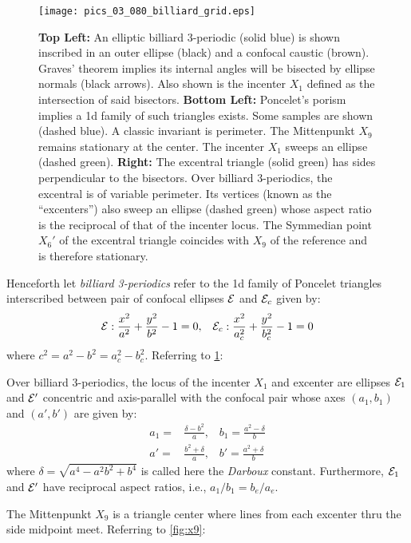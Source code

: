 \begin{figure}
    \centering
    \texttt{[image: pics\_03\_080\_billiard\_grid.eps]}
    \caption{\textbf{Top Left:} An elliptic billiard 3-periodic (solid blue) is shown inscribed in an outer ellipse (black) and a confocal caustic (brown). Graves' theorem implies its internal angles will be bisected by ellipse normals (black arrows). Also shown is the incenter $X_1$ defined as the intersection of said bisectors. \textbf{Bottom Left:} Poncelet's porism implies a 1d family of such triangles exists. Some samples are shown (dashed blue). A classic invariant is  perimeter. The Mittenpunkt $X_9$ remains stationary at the center. The incenter $X_1$ sweeps an ellipse (dashed green). \textbf{Right:} The excentral triangle (solid green) has sides perpendicular to the bisectors. Over billiard 3-periodics, the excentral is of variable perimeter. Its vertices (known as the ``excenters'') also sweep an ellipse (dashed green) whose aspect ratio is the reciprocal of that of the incenter locus. The Symmedian point $X_6'$ of the excentral triangle coincides with $X_9$ of the reference and is therefore stationary.}
    \label{fig:billiard-grid}
\end{figure}

Henceforth let {\em billiard 3-periodics} refer to the 1d family of Poncelet triangles interscribed between pair of confocal ellipses $\mathcal{E}$ and $\mathcal{E}_c$ given by:
\[ \mathcal{E}:\frac{x^2}{a^2}+\frac{y^2}{b^2}-1=0,\;\;\;\mathcal{E}_c:\frac{x^2}{a_c^2}+\frac{y^2}{b_c^2}-1=0\]
where $c^2=a^2-b^2=a_c^2-b_c^2$. Referring to \cref{fig:billiard-grid}:

\begin{theorem}
Over billiard 3-periodics, the locus of the incenter $X_1$ and excenter are ellipses $\mathcal{E}_1$ and $\mathcal{E}'$ concentric and axis-parallel with the confocal pair whose axes $(a_1,b_1)$ and $(a',b')$ are given by:
\begin{align*}
a_1 =& \frac{\delta-b^2 }{a},\;\;\;b_1=\frac{a^2-\delta}{b}\\ 
a'= &\frac{{b}^{2}+\delta}{a},\;\;\;b'=\frac{{a}^{2}+\delta}{b}
\end{align*}
where $\delta=\sqrt{a^4-a^2b^2+b^4}$ is called here the {\em Darboux} constant. 
Furthermore, $\mathcal{E}_1$ and $\mathcal{E}'$ have reciprocal aspect ratios, i.e., $a_1/b_1=b_e/a_e$.
\label{thm:03_incenter_excenter}
\end{theorem}

The Mittenpunkt $X_9$ is a triangle center where lines from each excenter thru the side midpoint meet. Referring to \cref{fig:x9}:

